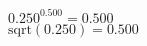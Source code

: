 \documentclass{article}
\begin{document}
$0.250^{0.500}=0.500$\\
$\text{sqrt}(0.250)=0.500$\\
\end{document}
